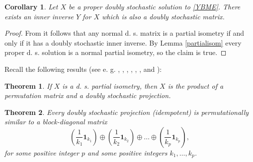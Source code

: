 \documentclass{article}
\newtheorem{theorem}{Theorem}[section]
\newtheorem{corollary}{Corollary}[section]
\theoremstyle{definition}\newtheorem{example}{Example}[section]
\begin{document}
	\begin{corollary}
		Let $X$ be a proper doubly stochastic solution to \eqref{YBME}. There exists an inner inverse $Y$ for $X$ which is also a doubly stochastic matrix.
	\end{corollary}
	\begin{proof}
		From \cite[Theorem 3]{Prasad} it follows that any normal d. s. matrix is a partial isometry if and only if it has a doubly stochastic inner inverse. By Lemma \ref{partialisom} every proper d. s. solution is a normal partial isometry, so the claim is true.
	\end{proof}
	\noindent Recall the following results (see e. g. \cite{cruz}, \cite{cruzcor}, \cite{JLD},  \cite{HKF}, \cite{SGHSSP}, \cite{RJPGR}, and \cite{AWMIOBCA}):
	
	\begin{theorem} \label{pi} If $X$ is a d. s. partial isometry, then $X$ is the product of a permutation matrix and a doubly stochastic projection. 
	\end{theorem}
	
	\begin{theorem}\label{projection} Every doubly stochastic projection (idempotent) is permutationally similar to a block-diagonal matrix
			$$\left(\frac{1}{k_1}\mathbf{1}_{k_1}\right)\oplus\left(\frac{1}{k_2}\mathbf{1}_{k_2}\right)\oplus\ldots\oplus\left(\frac{1}{k_p}\mathbf{1}_{k_p}\right),$$
			for some positive integer $p$ and some positive integers $k_1,\ldots,k_p$.
		\end{theorem}
	
\end{document}
